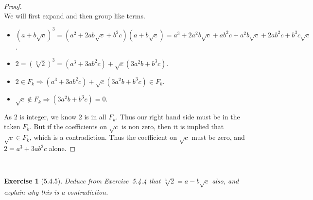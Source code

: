 \documentclass[12pt]{article}
\newcommand{\XB}{\color{black}}
\newcommand{\XBB}{\color{blue}}
\newcommand{\ds}{\displaystyle}
\theoremstyle{plain}
\newtheorem{ex}{Exercise}
\begin{document}
\begin{proof}
  \ \\

  We will first expand and then group like terms.

  \begin{itemize}
    \item $ \ds (a + b\sqrt{c})^{3} = (a^{2} + 2ab\sqrt{c} + b^{2}c)(a+b\sqrt{c}) = a^{3} + 2a^{2}b\sqrt{c} + ab^{2}c + a^{2}b\sqrt{c} + 2ab^{2}c + b^{3}c\sqrt{c} $.
    \item $ \ds 2 = (\sqrt[3]{2})^{3} = (a^{3} + 3ab^{2}c) + \sqrt{c}(3a^{2}b + b^{3}c) $.
    \item $ \ds 2 \in F_{k} \Rightarrow (a^{3} + 3ab^{2}c) + \sqrt{c}(3a^{2}b + b^{3}c) \in F_{k} $.
    \item $ \ds \sqrt{c} \notin F_{k} \Rightarrow (3a^{2}b + b^{3}c) = 0 $.
  \end{itemize}

  As $ 2 $ is integer, we know $ 2 $ is in all $ F_{k} $.
  Thus our right hand side must be in the taken $ F_{k} $.
  But if the coefficients on $ \sqrt{c} $ is non zero, then it is implied that $ \sqrt{c} \in F_{k} $, which is a contradiction.
  Thus the coefficient on $ \sqrt{c} $ must be zero, and $ 2 = a^{3} + 3ab^{2}c $ alone.

\end{proof}

\newpage

\XBB\hrulefill\XB \\
\begin{ex} [5.4.5]
  Deduce from Exercise~5.4.4 that $ \sqrt[3]{2} = a - b\sqrt{c} $ also, and explain why this is a contradiction.
\end{ex}
\XBB\hrulefill\XB \\
\end{document}
